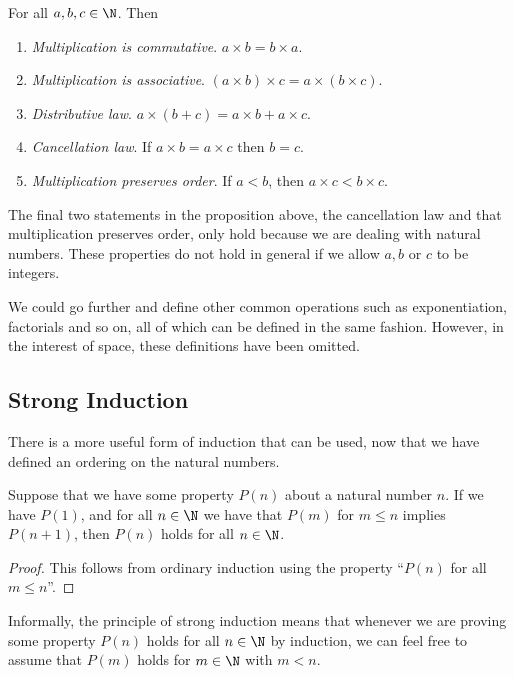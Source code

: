 \documentclass[a4paper]{scrartcl}
\begin{document}
\begin{proposition}
	For all $a, b, c \in \N$. Then
	\begin{enumerate}[label=(\roman*)]
		\item \emph{Multiplication is commutative}. $a \times b = b \times a$.
		\item \emph{Multiplication is associative}. $(a \times b) \times c = a \times (b \times c)$.
		\item \emph{Distributive law}. $a \times(b + c) = a \times b + a \times c$. 
		\item \emph{Cancellation law}. If $a\times b = a\times c$ then $b = c$.
		\item \emph{Multiplication preserves order}. If $a < b$, then $a\times c < b \times c$.
	\end{enumerate}
\end{proposition}
\begin{remark}
	The final two statements in the proposition above, the cancellation law and that multiplication preserves order, only hold because we are dealing with natural numbers. These properties do not hold in general if we allow $a, b$ or $c$ to be integers.
\end{remark}

We could go further and define other common operations such as exponentiation, factorials and so on, all of which can be defined in the same fashion. However, in the interest of space, these definitions have been omitted.

\subsection{Strong Induction}

There is a more useful form of induction that can be used, now that we have defined an ordering on the natural numbers.

\begin{proposition}
	Suppose that we have some property $P(n)$ about a natural number $n$. If we have $P(1)$, and for all $n \in \N$ we have that $P(m)$ for $m \leq n$ implies $P(n + 1)$, then $P(n)$ holds for all $n \in \N$.
\end{proposition}
\begin{proof}
	This follows from ordinary induction using the property ``$P(n)$ for all $m \leq n$''.
\end{proof}

Informally, the principle of strong induction means that whenever we are proving some property $P(n)$ holds for all $n \in \N$ by induction, we can feel free to assume that $P(m)$ holds for $m \in \N$ with $m < n$.
\end{document}

